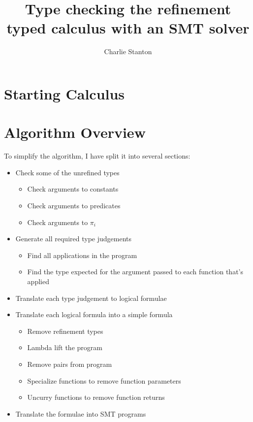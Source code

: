 \documentclass[12pt,a4paper,titlepage]{article}
\title{Type checking the refinement typed calculus with an SMT solver}
\author{Charlie Stanton}
\begin{document}
    \maketitle

    \section{Starting Calculus}

    \section{Algorithm Overview}
    To simplify the algorithm, I have split it into several sections:

    \begin{itemize}
        \item Check some of the unrefined types
        \begin{itemize}
            \item Check arguments to constants
            \item Check arguments to predicates
            \item Check arguments to $\pi_i$
        \end{itemize}
        \item Generate all required type judgements
        \begin{itemize}
            \item Find all applications in the program
            \item Find the type expected for the argument passed to each function that's applied
        \end{itemize}
        \item Translate each type judgement to logical formulae
        \item Translate each logical formula into a simple formula
        \begin{itemize}
            \item Remove refinement types
            \item Lambda lift the program
            \item Remove pairs from program
            \item Specialize functions to remove function parameters
            \item Uncurry functions to remove function returns
        \end{itemize}
        \item Translate the formulae into SMT programs
    \end{itemize}
\end{document}
